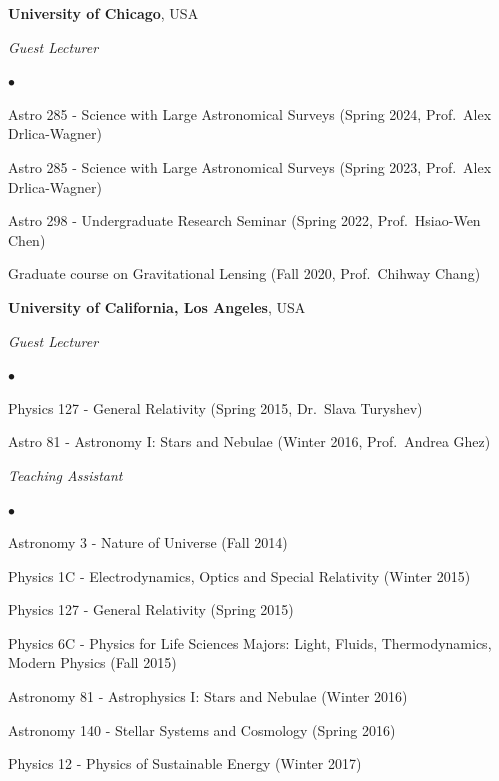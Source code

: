 \documentclass[margin, line]{res}
\newenvironment{list2}{
  \begin{list}{$\bullet$}{%
      \setlength{\itemsep}{0in}
      \setlength{\parsep}{0in} \setlength{\parskip}{0in}
      \setlength{\topsep}{0in} \setlength{\partopsep}{0in} 
      \setlength{\leftmargin}{0.2in}}}{\end{list}}
\begin{document}
\begin{resume}
{\bf University of Chicago}, USA

{\em Guest Lecturer} \hfill {\bf}\\
\begin{list2}
	\item Astro 285 - Science with Large Astronomical Surveys (Spring 2024, Prof.~Alex Drlica-Wagner)
	\item Astro 285 - Science with Large Astronomical Surveys (Spring 2023, Prof.~Alex Drlica-Wagner)
	\item Astro 298 - Undergraduate Research Seminar (Spring 2022, Prof.~Hsiao-Wen Chen)
 	\item Graduate course on Gravitational Lensing (Fall 2020, Prof.~Chihway Chang)
\end{list2}
	
	
{\bf University of California, Los Angeles}, USA



{\em Guest Lecturer} \hfill {\bf}\\
\begin{list2}
	\item Physics 127 - General Relativity (Spring 2015, Dr.~Slava Turyshev)
	\item Astro 81 - Astronomy I: Stars and Nebulae (Winter 2016, Prof.~Andrea Ghez)
\end{list2}
	
{\em Teaching Assistant} \hfill {}\\
\begin{list2}
	\item Astronomy 3 - Nature of Universe (Fall 2014)
	\item Physics 1C - Electrodynamics, Optics and Special Relativity (Winter 2015)
	\item Physics 127 - General Relativity (Spring 2015)
	\item Physics 6C - Physics for Life Sciences Majors: Light, Fluids, Thermodynamics, Modern Physics (Fall 2015)
	\item Astronomy 81 - Astrophysics I: Stars and Nebulae (Winter 2016)
	\item Astronomy 140 - Stellar Systems and Cosmology (Spring 2016)
	\item Physics 12 - Physics of Sustainable Energy (Winter 2017)
\end{list2}


\end{resume}
\end{document}
